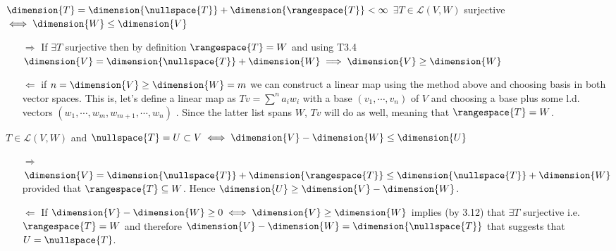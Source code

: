 \exo{} $\dimension{T} = \dimension{\nullspace{T}} + \dimension{\rangespace{T}} < \infty$
\exo{} $\exists T \in\mathcal{L}(V,W)$ surjective $ \iff \dimension{W}\leq \dimension{V}$
\begin{itemize}
  \item[$\Rightarrow$] If $\exists T$ surjective then by definition $\rangespace{T} = W$ and using T3.4 
  $\dimension{V} = \dimension{\nullspace{T}} + \dimension{W} \implies \dimension{V}\geq \dimension{W}$
  \item[$\Leftarrow$] if $n=\dimension{V}\geq \dimension{W}=m$ we can construct a linear map using the method above and
  choosing basis in both vector spaces. This is, let's define a linear map as $Tv = \sum^n a_i w_i$ with a base 
  $(v_1, \cdots, v_n)$ of $V$ and choosing a base plus some l.d. vectors $(w_1, \cdots, w_m, w_{m+1}, \cdots, w_n)$ . 
  Since the latter list spans $W$, $Tv$ will do as well, meaning that $\rangespace{T} = W$.
\end{itemize}

\exo{} $T\in\mathcal{L}(V,W)$ and $\nullspace{T}=U \subset V \iff \dimension{V} - \dimension{W} \leq \dimension{U}$
\begin{itemize}
\item[$\Rightarrow$] $\dimension{V}=\dimension{\nullspace{T}} + \dimension{\rangespace{T}}\leq \dimension{\nullspace{T}} + \dimension{W}$ provided that $\rangespace{T}\subseteq W$. Hence $\dimension{U} \geq \dimension{V} - \dimension{W}$. 
\item[$\Leftarrow$] If $\dimension{V} - \dimension{W} \geq 0 \iff \dimension{V} \geq \dimension{W}$ implies (by 3.12) that $\exists T$ surjective
i.e. $\rangespace{T} = W$ and therefore $\dimension{V} - \dimension{W} = \dimension{\nullspace{T}}$ that suggests that $U=\nullspace{T}$.
\end{itemize}

\exo{}


